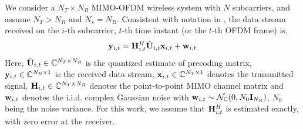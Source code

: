 \documentclass[conference]{IEEEtran}
\begin{document}
{We consider a $N_T\times N_R$ MIMO-OFDM wireless system with $N$ subcarriers, and assume $N_T > N_R$ and $N_s = N_R$.
Consistent with notation in \cite{6891198,Gupt1905:Predictive}, the data stream received on the $i$-th subcarrier, $t$-th time instant (or the $t$-th OFDM frame) is,
\vspace{-1pt}
\begin{equation}
{\bf y}_{i,t}={\bf H}^{H}_{i,t}\tilde{{\bf U}}_{i,t}{\bf x}_{i,t}+ {\bf w}_{i,t}
\end{equation}
\vspace{-1pt}
Here, $\tilde{{\bf U}}_{i,t} \in \mathbb{C}^{N_T \times N_R}$ is the quantized estimate of precoding matrix, ${\bf y}_{i,t} \in \mathbb{C}^{N_R \times 1}$ is the received data stream, ${\bf x}_{i,t} \in \mathbb{C}^{N_T \times 1}$ denotes the transmitted signal, ${\bf H}_{i,t} \in \mathbb{C}^{N_T \times N_R}$ denotes the point-to-point MIMO channel matrix and ${\bf w}_{i,t}$ denotes the i.i.d. complex Gaussian noise with ${\bf w}_{i,t} \sim \mathcal{N}_{\mathbb{C}}(0,N_0{\bf I}_{N_R})$, $N_0$ being the noise variance. For this work, we assume that ${\bf H}^{H}_{i,t}$ is estimated exactly, with zero error at the receiver.



}
\end{document}
